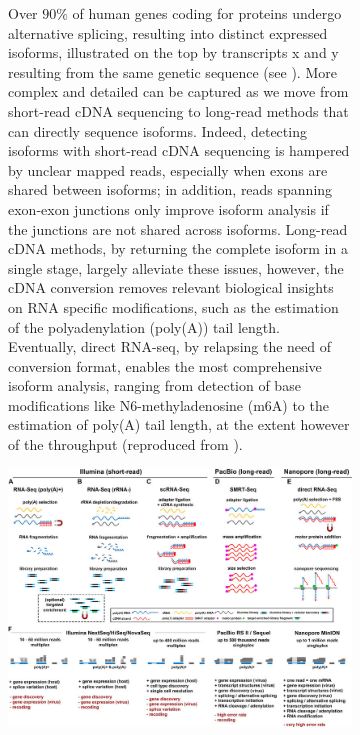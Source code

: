 {{\begin{figure}
\begin{subfigure}[p]{0.55\textwidth}
         \label{subfig:library-comparison-limitation}
         \caption[\textbf{Comparison of short-read, long-read and direct RNA-seq analysis:}]{Over $90\%$ of human genes coding for proteins undergo alternative splicing, resulting into distinct expressed isoforms, illustrated on the top by transcripts x and y resulting from the same genetic sequence (see ).
                  More complex and detailed can be captured as we move from short-read cDNA sequencing to long-read methods that can directly sequence isoforms. Indeed, detecting isoforms with short-read cDNA sequencing is hampered by unclear mapped reads, especially when exons are shared between isoforms; in addition, reads spanning exon-exon junctions only improve isoform analysis if the junctions are not shared across isoforms. 
          Long-read cDNA methods, by returning the complete isoform in a single stage, largely alleviate these issues, however, the cDNA conversion removes relevant biological insights on RNA specific modifications, such as the estimation of the polyadenylation (poly(A)) tail length. 
          Eventually, direct RNA-seq, by relapsing the need of conversion format, enables the most comprehensive isoform analysis, ranging from detection of base modifications like N6-methyladenosine (m6A) to the estimation of poly(A) tail length, at the extent however of the throughput (reproduced from \autocite[Fig. 1, part C]{stark_etal19}).}
     \end{subfigure}
     \vfill
     \begin{subfigure}[p]{0.95\textwidth}
         \centering
         \includegraphics[width=\textwidth]{figures/biological_introduction/global_review_long_vs_short.png}

\end{subfigure}
\end{figure}}}
